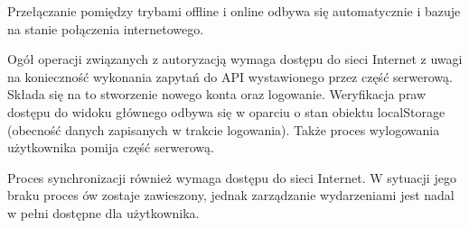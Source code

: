 Przełączanie pomiędzy trybami offline i online odbywa się automatycznie i bazuje na stanie połączenia internetowego. 

Ogół operacji związanych z autoryzacją wymaga dostępu do sieci Internet z uwagi na konieczność wykonania zapytań do API wystawionego przez część serwerową. Składa się na to stworzenie nowego konta oraz logowanie. Weryfikacja praw dostępu do widoku głównego odbywa się w oparciu o stan obiektu localStorage (obecność danych zapisanych w trakcie logowania). Także proces wylogowania użytkownika pomija część serwerową.

Proces synchronizacji również wymaga dostępu do sieci Internet. W sytuacji jego braku proces ów zostaje zawieszony, jednak zarządzanie wydarzeniami jest nadal w pełni dostępne dla użytkownika.
